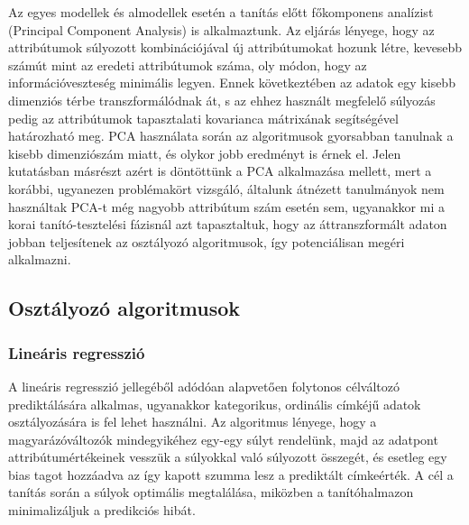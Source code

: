\documentclass[12pt]{article}
\begin{document}
Az egyes modellek és almodellek esetén a tanítás előtt főkomponens analízist (Principal Component Analysis) is alkalmaztunk. Az eljárás lényege, hogy az attribútumok súlyozott kombinációjával új attribútumokat hozunk létre, kevesebb számút mint az eredeti attribútumok száma, oly módon, hogy az információveszteség minimális legyen. Ennek következtében az adatok egy kisebb dimenziós térbe transzformálódnak át, s az ehhez használt megfelelő súlyozás pedig az attribútumok tapasztalati kovarianca mátrixának segítségével határozható meg. PCA használata során az algoritmusok gyorsabban tanulnak a kisebb dimenziószám miatt, és olykor jobb eredményt is érnek el. Jelen kutatásban másrészt azért is döntöttünk a PCA alkalmazása mellett, mert a korábbi, ugyanezen problémakört vizsgáló, általunk átnézett tanulmányok nem használtak PCA-t még nagyobb attribútum szám esetén sem, ugyanakkor mi a korai tanító-tesztelési fázisnál azt tapasztaltuk, hogy az áttranszformált adaton jobban teljesítenek az osztályozó algoritmusok, így potenciálisan megéri alkalmazni.



\subsection{Osztályozó algoritmusok}

%

\subsubsection{Lineáris regresszió}

A lineáris regresszió jellegéből adódóan alapvetően folytonos célváltozó prediktálására alkalmas, ugyanakkor kategorikus, ordinális címkéjű adatok osztályozására is fel lehet használni. Az algoritmus lényege, hogy a magyarázóváltozók mindegyikéhez egy-egy súlyt rendelünk, majd az adatpont attribútumértékeinek vesszük a súlyokkal való súlyozott összegét, és esetleg egy bias tagot hozzáadva az így kapott szumma lesz a prediktált címkeérték. A cél a tanítás során a súlyok optimális megtalálása, miközben a tanítóhalmazon minimalizáljuk a predikciós hibát.
\end{document}
